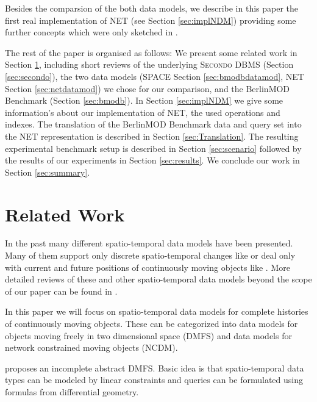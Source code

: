 \documentclass[a4paper]{article}
\newcommand{\secondo}{\textsc{Secondo}}
\newcommand{\bmodb} {BerlinMOD Benchmark}
\begin{document}
Besides the comparsion of the both data models, we describe in this paper the
first real implementation of NET (see Section \ref{sec:implNDM}) providing some
further concepts which were only sketched in \cite{NetworkGueting}.

The rest of the paper is organised as follows: We present some related work in
Section
\ref{sec:relWork}, including short reviews of the underlying \secondo{} DBMS
(Section \ref{sec:secondo}), the two data models (SPACE Section
\ref{sec:bmodbdatamod},
NET Section \ref{sec:netdatamod}) we chose for our comparison, and the
\bmodb{} (Section \ref{sec:bmodb}).
In Section \ref{sec:implNDM} we give some information's about our implementation
of NET, the used operations and indexes.
The translation of the \bmodb{} data and query set into the NET representation
is described in Section \ref{sec:Translation}. The resulting experimental benchmark
setup is described in Section \ref{sec:scenario} followed by the results of our
experiments in Section \ref{sec:results}. We conclude our work in Section
\ref{sec:summary}.
\section{Related Work}
\label{sec:relWork}
In the past many different spatio-temporal data models have been presented. Many
of them support only discrete spatio-temporal changes like
\cite{sqlstchen,HunterWilliamson,Langran2,Langran1,Ramadrachan}
or deal only with current and future positions of continuously moving objects like
\cite{MOSTWolfson}. More detailed reviews of these and other spatio-temporal
data models beyond the scope of our paper can be found in \cite{ReviewSTDMPelekis}.

In this paper we will focus on spatio-temporal data models for complete histories
of continuously moving objects. These can be categorized into data models for
objects moving freely in two dimensional space (DMFS) and data models for network
constrained moving objects (NCDM).

\cite{MOLRaQSu} proposes an incomplete abstract DMFS. Basic idea is that
spatio-temporal data types can be modeled by linear constraints and queries
can be formulated using formulas from differential geometry.
\end{document}
